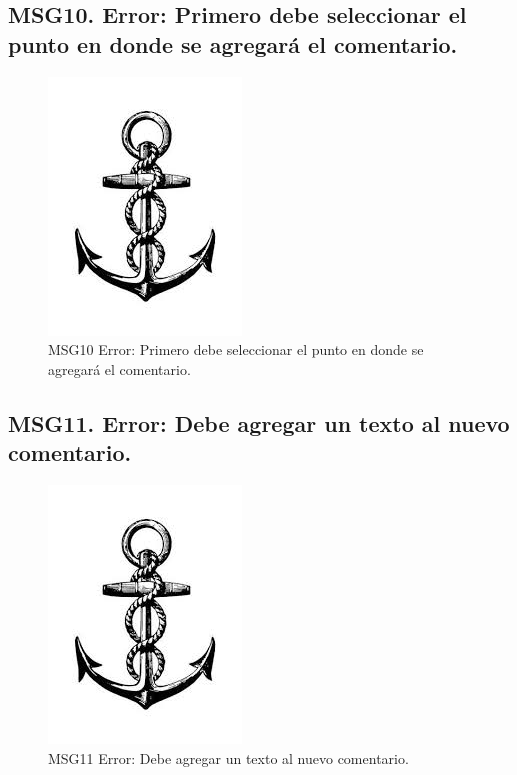 \subsection{MSG10. Error: Primero debe seleccionar el punto en donde se agregará el comentario.}
    \begin{figure}[htbp]
        \begin{center}
            \includegraphics[width=.4\textwidth]{images/MSG/ancla}
            \caption{MSG10 Error: Primero debe seleccionar el punto en donde se agregará el comentario.}
            \label{fig:MSG10}
        \end{center}
    \end{figure}

\subsection{MSG11. Error: Debe agregar un texto al nuevo comentario.}
    \begin{figure}[htbp]
        \begin{center}
            \includegraphics[width=.4\textwidth]{images/MSG/ancla}
            \caption{MSG11 Error: Debe agregar un texto al nuevo comentario.}
            \label{fig:MSG11}
        \end{center}
    \end{figure}

